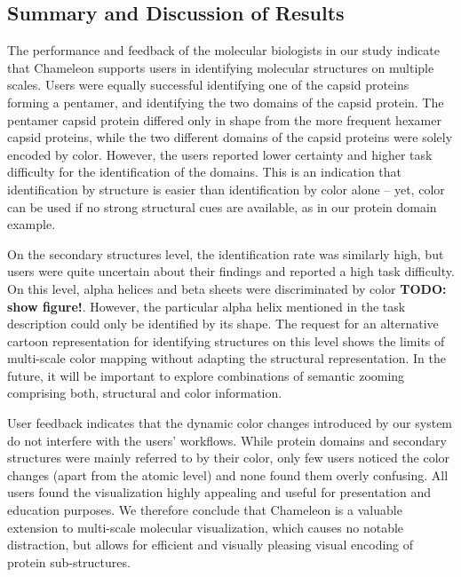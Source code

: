 \documentclass{egpubl}
\begin{document}
\subsection{Summary and Discussion of Results}

The performance and feedback of the molecular biologists in our study indicate that Chameleon supports users in identifying molecular structures on multiple scales. 
Users were equally successful identifying one of the capsid proteins forming a pentamer, and identifying the two domains of the capsid protein. 
The pentamer capsid protein differed only in shape from the more frequent hexamer capsid proteins, while the two different domains of the capsid proteins were solely encoded by color. 
However, the users reported lower certainty and higher task difficulty for the identification of the domains.
This is an indication that identification by structure is easier than identification by color alone -- yet, color can be used if no strong structural cues are available, as in our protein domain example. 

On the secondary structures level, the identification rate was similarly high, but users were quite uncertain about their findings and reported a high task difficulty. 
On this level, alpha helices and beta sheets were discriminated by color \textbf{TODO: show figure!}. 
However, the particular alpha helix mentioned in the task description could only be identified by its shape. 
The request for an alternative cartoon representation for identifying structures on this level shows the limits of multi-scale color mapping without adapting the structural representation. 
In the future, it will be important to explore combinations of semantic zooming comprising both, structural and color information. 

User feedback indicates that the dynamic color changes introduced by our system do not interfere with the users' workflows. 
While protein domains and secondary structures were mainly referred to by their color, only few users noticed the color changes (apart from the atomic level) and none found them overly confusing. 
All users found the visualization highly appealing and useful for presentation and education purposes. 
We therefore conclude that Chameleon is a valuable extension to multi-scale molecular visualization, which causes no notable distraction, but allows for efficient and visually pleasing visual encoding of protein sub-structures. 
\end{document}
